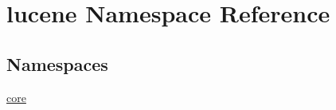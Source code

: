 \hypertarget{namespacelucene}{}\section{lucene Namespace Reference}
\label{namespacelucene}
\subsection*{Namespaces}
\begin{DoxyCompactItemize}
\item 
 \mbox{\hyperlink{namespacelucene_1_1core}{core}}
\end{DoxyCompactItemize}

